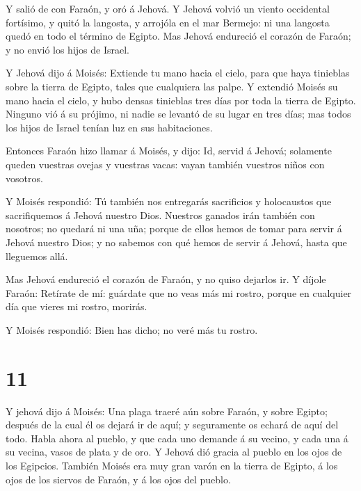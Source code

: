  Y salió de con Faraón, y oró á Jehová.  Y
Jehová volvió un viento occidental fortísimo, y quitó la langosta, y
arrojóla en el mar Bermejo: ni una langosta quedó en todo el término de
Egipto.  Mas Jehová endureció el corazón de Faraón; y no
envió los hijos de Israel.

 Y Jehová dijo á Moisés: Extiende tu mano hacia el cielo,
para que haya tinieblas sobre la tierra de Egipto, tales que cualquiera
las palpe.  Y extendió Moisés su mano hacia el cielo, y
hubo densas tinieblas tres días por toda la tierra de Egipto.
 Ninguno vió á su prójimo, ni nadie se levantó de su lugar
en tres días; mas todos los hijos de Israel tenían luz en sus
habitaciones.

 Entonces Faraón hizo llamar á Moisés, y dijo: Id, servid á
Jehová; solamente queden vuestras ovejas y vuestras vacas: vayan también
vuestros niños con vosotros.

 Y Moisés respondió: Tú también nos entregarás sacrificios
y holocaustos que sacrifiquemos á Jehová nuestro Dios. 
Nuestros ganados irán también con nosotros; no quedará ni una uña;
porque de ellos hemos de tomar para servir á Jehová nuestro Dios; y no
sabemos con qué hemos de servir á Jehová, hasta que lleguemos allá.

 Mas Jehová endureció el corazón de Faraón, y no quiso
dejarlos ir.  Y díjole Faraón: Retírate de mí: guárdate que
no veas más mi rostro, porque en cualquier día que vieres mi rostro,
morirás.

 Y Moisés respondió: Bien has dicho; no veré más tu rostro.

\hypertarget{section-10}{%
\section{11}\label{section-10}}

 Y jehová dijo á Moisés: Una plaga traeré aún sobre Faraón,
y sobre Egipto; después de la cual él os dejará ir de aquí; y
seguramente os echará de aquí del todo.  Habla ahora al
pueblo, y que cada uno demande á su vecino, y cada una á su vecina,
vasos de plata y de oro.  Y Jehová dió gracia al pueblo en
los ojos de los Egipcios. También Moisés era muy gran varón en la tierra
de Egipto, á los ojos de los siervos de Faraón, y á los ojos del pueblo.

